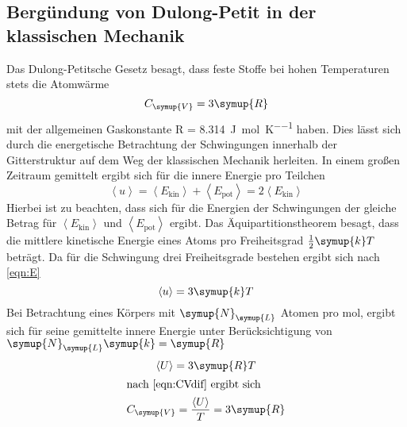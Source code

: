 \subsection{Bergündung von Dulong-Petit in der klassischen Mechanik}
Das Dulong-Petitsche Gesetz besagt, dass feste Stoffe bei hohen Temperaturen
stets die Atomwärme
\begin{equation}
  C_\symup{V}= 3\symup{R}
\end{equation}
mit der allgemeinen Gaskonstante R = \SI{8,314}{\joule\per\mol\per\kelvin}
haben. Dies lässt sich durch die energetische Betrachtung der Schwingungen innerhalb
der Gitterstruktur auf dem Weg der klassischen Mechanik herleiten.
In einem großen Zeitraum gemittelt ergibt sich für die innere Energie pro Teilchen
\begin{equation}
  \left<u\right> = \left<E_\text{kin}\right> + \left<E_\text{pot}\right>
  = 2\left<E_\text{kin}\right>
  \label{eqn:E}
\end{equation}
Hierbei ist zu beachten, dass sich für die Energien der Schwingungen der gleiche
Betrag für $\left<E_\text{kin}\right>$ und $\left<E_\text{pot}\right>$ ergibt.
Das Äquipartitionstheorem besagt, dass die mittlere kinetische Energie eines Atoms
pro Freiheitsgrad
$\frac{1}{2}\symup{k}T$ beträgt. Da für die Schwingung drei Freiheitsgrade bestehen
ergibt sich nach \eqref{eqn:E}
\begin{equation}
  \left<u\right> = 3\symup{k}T
\end{equation}
Bei Betrachtung eines Körpers mit $\symup{N}_\symup{L}$ Atomen pro mol, ergibt sich für
seine gemittelte innere Energie unter Berücksichtigung von $\symup{N}_\symup{L}\symup{k} = \symup{R}$
\begin{gather}
  \left<U\right> = 3\symup{R}T\\
  \intertext{nach \eqref{eqn:CVdif} ergibt sich}
  C_\symup{V} = \frac{\left<U\right>}{T} = 3\symup{R}
\end{gather}

